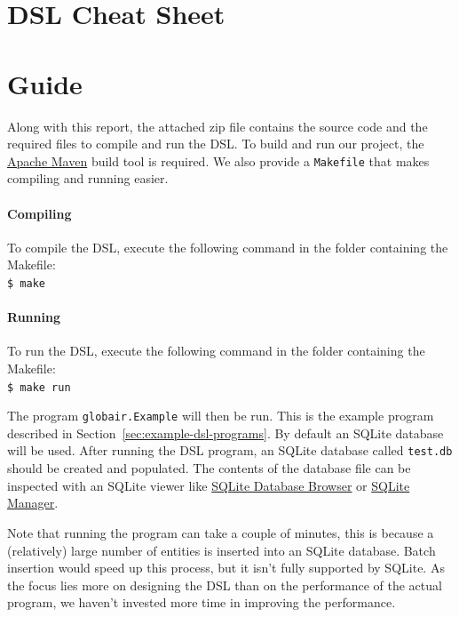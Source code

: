 \documentclass[a4paper]{article}
\newcommand{\cc}[1]{\texttt{#1}}
\begin{document}
\clearpage
\section{DSL Cheat Sheet}
\label{sec: cheat-sheet}




\clearpage
\section{Guide}
\label{sec:guide}


Along with this report, the attached zip file contains the source code and the required files to compile and run the DSL\@.
To build and run our project, the \href{http://maven.apache.org/}{Apache Maven} build tool is required.
We also provide a \cc{Makefile} that makes compiling and running easier.

\vspace{-1em}
\paragraph{Compiling}
To compile the DSL, execute the following command in the folder containing the Makefile:\\
\cc{\$ make}

\vspace{-1em}
\paragraph{Running}
To run the DSL, execute the following command in the folder containing the Makefile:\\
\cc{\$ make run}

The program \cc{globair.Example} will then be run.
This is the example program described in Section~\ref{sec:example-dsl-programs}.
By default an SQLite database will be used.
After running the DSL program, an SQLite database called \cc{test.db} should be created and populated.
The contents of the database file can be inspected with an SQLite viewer like \href{http://sourceforge.net/projects/sqlitebrowser/}{SQLite Database Browser} or \href{https://addons.mozilla.org/en-us/firefox/addon/sqlite-manager/}{SQLite Manager}.

Note that running the program can take a couple of minutes, this is because a (relatively) large number of entities is inserted into an SQLite database.
Batch insertion would speed up this process, but it isn't fully supported by SQLite.
As the focus lies more on designing the DSL than on the performance of the actual program, we haven't invested more time in improving the performance.
\end{document}
